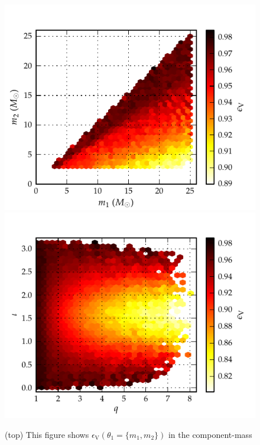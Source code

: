 \begin{figure}
\centering
\includegraphics[keepaspectratio=true, scale=0.04, clip=false, height=0.4\textheight]{figures/eobpnmetric/EOBHMvsEOB22VeffLossm1m2-PRD.pdf} %
\includegraphics[keepaspectratio=true, scale=0.04, clip=false, height=0.4\textheight]{figures/eobpnmetric/EOBHMvsEOB22VeffLossqinc-PRD.pdf} %
\caption{\label{fig:VeffLoss_eob22eobhm} (top) This figure shows $\epsilon_{\mathrm{V}}\left(\theta_1=\{m_1,m_2\}\right)$ in the component-mass
}
\end{figure}
